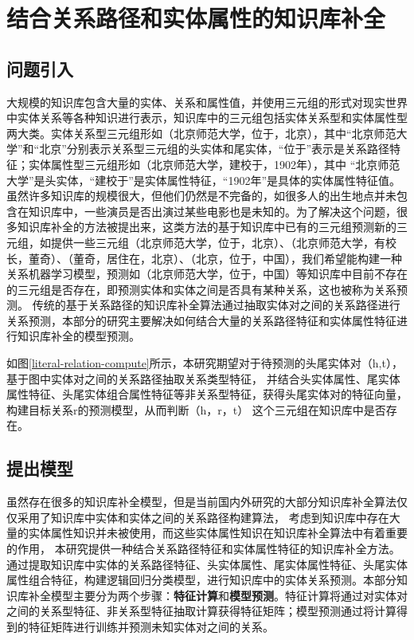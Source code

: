 

\chapter{结合关系路径和实体属性的知识库补全}
\label{cha:kbc-lit-relation}

\section{问题引入}
大规模的知识库包含大量的实体、关系和属性值，并使用三元组的形式对现实世界中实体关系等各种知识进行表示，知识库中的三元组包括实体关系型和实体属性型两大类。实体关系型三元组形如（北京师范大学，位于，北京），其中“北京师范大学”和“北京”分别表示关系型三元组的头实体和尾实体，“位于”表示是关系路径特征；实体属性型三元组形如（北京师范大学，建校于，1902年），其中 “北京师范大学”是头实体，“建校于”是实体属性特征，“1902年”是具体的实体属性特征值。
虽然许多知识库的规模很大，但他们仍然是不完备的，如很多人的出生地点并未包含在知识库中，一些演员是否出演过某些电影也是未知的。为了解决这个问题，很多知识库补全的方法被提出来，这类方法的基于知识库中已有的三元组预测新的三元组，如提供一些三元组（北京师范大学，位于，北京）、（北京师范大学，有校长，董奇）、（董奇，居住在，北京）、（北京，位于，中国），我们希望能构建一种关系机器学习模型，预测如（北京师范大学，位于，中国）等知识库中目前不存在的三元组是否存在，即预测实体和实体之间是否具有某种关系，这也被称为关系预测。
传统的基于关系路径的知识库补全算法通过抽取实体对之间的关系路径进行关系预测，本部分的研究主要解决如何结合大量的关系路径特征和实体属性特征进行知识库补全的模型预测。

如图\ref{literal-relation-compute}所示，本研究期望对于待预测的头尾实体对（h,t），基于图中实体对之间的关系路径抽取关系类型特征，
并结合头实体属性、尾实体属性特征、头尾实体组合属性特征等非关系型特征，获得头尾实体对的特征向量，
构建目标关系r的预测模型，从而判断（h，r，t）
这个三元组在知识库中是否存在。

\section{提出模型}
虽然存在很多的知识库补全模型，但是当前国内外研究的大部分知识库补全算法仅仅采用了知识库中实体和实体之间的关系路径构建算法，
考虑到知识库中存在大量的实体属性知识并未被使用，而这些实体属性知识在知识库补全算法中有着重要的作用，
本研究提供一种结合关系路径特征和实体属性特征的知识库补全方法。
通过提取知识库中实体的关系路径特征、头实体属性、尾实体属性特征、头尾实体属性组合特征，构建逻辑回归分类模型，进行知识库中的实体关系预测。本部分知识库补全模型主要分为两个步骤：\textbf{特征计算}和\textbf{模型预测}。特征计算将通过对实体对之间的关系型特征、非关系型特征抽取计算获得特征矩阵；模型预测通过将计算得到的特征矩阵进行训练并预测未知实体对之间的关系。

